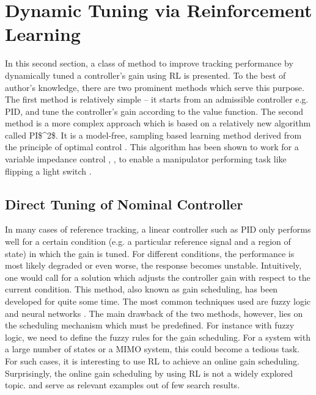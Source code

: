 \section{Dynamic Tuning via Reinforcement Learning} \label{sec:dytun}
In this second section, a class of method to improve tracking performance by dynamically tuned a controller's gain using \ac {RL} is presented. To the best of author's knowledge, there are two prominent methods which serve this purpose. The first method is relatively simple -- it starts from an admissible controller e.g. \ac{PID}, and tune the controller's gain according to the value function. The second method is a more complex approach which is based on a relatively new algorithm called \ac {PI$^2$}. It is a model-free, sampling based learning method derived from the principle of optimal control \cite{Buchli2010}. This algorithm has been shown to work for a variable impedance control \cite{Buchli6037312}, \cite{buchli2011learning}, \cite{theodorou2010generalized} to enable a manipulator performing task like flipping a light switch \cite{buchli2011learning}.

\subsection{Direct Tuning of Nominal Controller}
In many cases of reference tracking, a linear controller such as \ac{PID} only performs well for a certain condition (e.g. a particular reference signal and a region of state) in which the gain is tuned. For different conditions, the performance is most likely degraded or even worse, the response becomes unstable. Intuitively, one would call for a solution which adjusts the controller gain with respect to the current condition. This method, also known as gain scheduling, has been developed for quite some time. The most common techniques used are fuzzy logic \cite{375142} \cite{5229855} \cite{1684589} and neural networks \cite{6606304} \cite{572744} \cite{556252}. The main drawback of the two methods, however, lies on the scheduling mechanism which must be predefined. For instance with fuzzy logic, we need to define the fuzzy rules for the gain scheduling. For a system with a large number of states or a \ac {MIMO} system, this could become a tedious task. For such cases, it is interesting to use \ac {RL} to achieve an online gain scheduling. Surprisingly, the online gain scheduling by using \ac {RL} is not a widely explored topic. \cite{882916} and \cite{Brujeni5669655} serve as relevant examples out of few search results.

